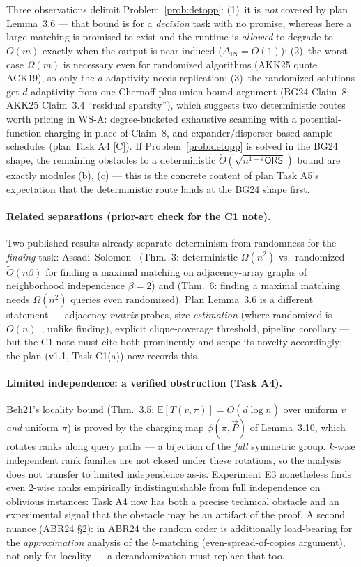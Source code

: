 \documentclass[11pt]{article}
\newcommand{\statusC}{\textsf{\footnotesize[C]}}
\newcommand{\ORS}{\mathsf{ORS}}
\newcommand{\Otilde}{\widetilde{O}}
\begin{document}
\noindent Three observations delimit Problem~\ref{prob:detopp}:
(1)~it is \emph{not} covered by plan Lemma~3.6 --- that bound is for a
\emph{decision} task with no promise, whereas here a large matching is
promised to exist and the runtime is \emph{allowed} to degrade to
$\Otilde(m)$ exactly when the output is near-induced
($\Delta_{\mathrm{IN}}=O(1)$); (2)~the worst case $\Omega(m)$ is necessary
even for randomized algorithms (AKK25 quote ACK19), so only the
$d$-adaptivity needs replication; (3)~the randomized solutions get
$d$-adaptivity from one Chernoff-plus-union-bound argument (BG24 Claim~8;
AKK25 Claim~3.4 ``residual sparsity''), which suggests two deterministic
routes worth pricing in WS-A: degree-bucketed exhaustive scanning with a
potential-function charging in place of Claim~8, and expander/disperser-based
sample schedules (plan Task A4 \statusC). If Problem~\ref{prob:detopp} is
solved in the BG24 shape, the remaining obstacles to a deterministic
$\Otilde(\sqrt{n^{1+\varepsilon}\ORS})$ bound are exactly modules (b), (c)
--- this is the concrete content of plan Task A5's expectation that the
deterministic route lands at the BG24 shape first.

\paragraph{Related separations (prior-art check for the C1 note).}
Two published results already separate determinism from randomness for the
\emph{finding} task: Assadi--Solomon~\cite{AS19} (Thm.~3: deterministic
$\Omega(n^2)$ vs.\ randomized $\Otilde(n\beta)$ for finding a maximal
matching on adjacency-array graphs of neighborhood independence $\beta=2$)
and \cite{ACK19} (Thm.~6: finding a maximal matching needs $\Omega(n^2)$
queries even randomized). Plan Lemma~3.6 is a different statement ---
adjacency-\emph{matrix} probes, size-\emph{estimation} (where randomized is
$\Otilde(n)$~\cite{Beh21}, unlike finding), explicit clique-coverage
threshold, pipeline corollary --- but the C1 note must cite both prominently
and scope its novelty accordingly; the plan (v1.1, Task C1(a)) now records
this.

\paragraph{Limited independence: a verified obstruction (Task A4).}
Beh21's locality bound (Thm.~3.5: $\mathbb{E}[T(v,\pi)]=O(\bar d\log n)$
over uniform $v$ \emph{and} uniform $\pi$) is proved by the charging map
$\phi(\pi,\vec P)$ of Lemma~3.10, which rotates ranks along query paths ---
a bijection of the \emph{full} symmetric group. $k$-wise independent rank
families are not closed under these rotations, so the analysis does not
transfer to limited independence as-is. Experiment E3 nonetheless finds even
$2$-wise ranks empirically indistinguishable from full independence on
oblivious instances: Task A4 now has both a precise technical obstacle and an
experimental signal that the obstacle may be an artifact of the proof.
A second nuance (ABR24 \S2): in ABR24 the random order is additionally
load-bearing for the \emph{approximation} analysis of the $b$-matching
(even-spread-of-copies argument), not only for locality --- a derandomization
must replace that too.
\end{document}
